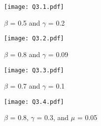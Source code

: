 \documentclass{article}
\begin{document}
\begin{figure}[htp]
    \centering
    \texttt{[image: Q3.1.pdf]}
    \caption{$\beta$ = 0.5 and $\gamma$ = 0.2}
    \label{fig:Q3.1}
\end{figure}


\begin{figure}[htp]
    \centering
    \texttt{[image: Q3.2.pdf]}
    \caption{$\beta$ = 0.8 and $\gamma$ = 0.09}
    \label{fig:Q3.2}
\end{figure}


\begin{figure}[htp]
    \centering
    \texttt{[image: Q3.3.pdf]}
    \caption{$\beta$ = 0.7 and $\gamma$ = 0.1}
    \label{fig:Q3.3}
\end{figure}


\begin{figure}[htp]
    \centering
    \texttt{[image: Q3.4.pdf]}
    \caption{$\beta$ = 0.8, $\gamma$ = 0.3, and $\mu$ = 0.05}
    \label{fig:Q3.4}
\end{figure}
\end{document}
